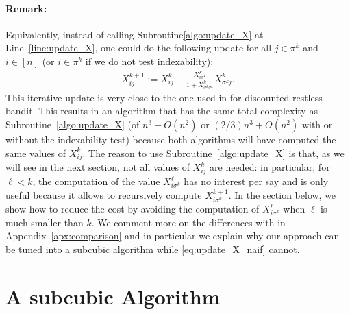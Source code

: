 \documentclass[acmsmall,screen,anonymous]{acmart}
\begin{document}
\paragraph{Remark:} Equivalently, instead of calling Subroutine\ref{algo:update_X} at Line~\ref{line:update_X}, one could do the following update for all $j\in\pi^k$ and $i\in[n]$ (or $i\in\pi^{k}$ if we do not test indexability):
\begin{align}
    X_{ij}^{k+1} := X_{ij}^{k} -\displaystyle\frac{X^{k}_{i\sigma^{k}}}{1+X^{k}_{\sigma^{k}\sigma^{k}}}X^{k}_{\sigma^{k}j}. \label{eq:update_X_naif}
\end{align}
This iterative update is very close to the one used in \cite{akbarzadeh2020conditions,nino2020fast} for discounted restless bandit. This results in an algorithm that has the same total complexity as Subroutine~\ref{algo:update_X} (of $n^3+O(n^2)$ or $(2/3)n^3+O(n^2)$ with or without the indexability test) because both algorithms will have computed the same values of $X^{k}_{ij}$. The reason to use Subroutine~\ref{algo:update_X} is that, as we will see in the next section, not all values of $X^{k}_{ij}$ are needed: in particular, for $\ell<k$, the computation of the value $X^\ell_{i\sigma^k}$ has no interest per say and is only useful because it allows to recursively compute $X^{k+1}_{i\sigma^k}$. In the section below, we show how to reduce the cost by avoiding the computation of $X^\ell_{i\sigma^k}$ when $\ell$ is much smaller than $k$. We comment more on the differences with \cite{akbarzadeh2020conditions,nino2020fast} in Appendix~\ref{apx:comparison} and in particular we explain why our approach can be tuned into a subcubic algorithm while \eqref{eq:update_X_naif} cannot.


\section{A subcubic Algorithm}
\label{sec:subcubic algorithm}
\end{document}
